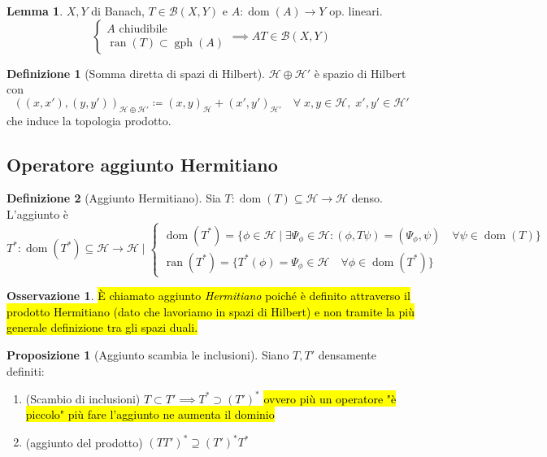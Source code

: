 \documentclass[a4paper,10pt]{article}
\theoremstyle{definition}
\DeclareMathOperator*{\ran}{ran}
\DeclareMathOperator*{\dom}{dom} %
\DeclareMathOperator*{\gr}{gph} %
\newcommand{\hil}{\mathcal{H}} %
\theoremstyle{indentdefinition}
\newtheorem{defn}{Definizione}[section]
\theoremstyle{indenttheorem}
\newtheorem{prop}{Proposizione}
\newtheorem{lem*}{Lemma}
\theoremstyle{myremark}
\newtheorem*{rem*}{Osservazione}
\theoremstyle{indentgeneral}
\begin{document}
\begin{lem*}
    $X,Y$ di Banach, $T\in\mathcal{B}(X,Y)$ e $A:\dom(A)\to Y$ op. lineari. $$\begin{cases}
        A \text{ chiudibile}\\
        \ran(T)\subset\gr(A)
    \end{cases}\implies AT \in \mathcal{B}(X,Y)$$
\end{lem*}

\begin{defn}[Somma diretta di spazi di Hilbert] $\hil\oplus\hil'$ è spazio di Hilbert con $$((x,x'),(y,y'))_{\hil\oplus\hil'}\coloneqq(x,y)_{\hil}+(x',y')_{\hil'}\quad \forall \;x,y\in\hil,\;x',y'\in\hil'$$
    che induce la topologia prodotto.
\end{defn}

\subsection{Operatore aggiunto Hermitiano}

\begin{defn}[Aggiunto Hermitiano]
    Sia $T:\dom(T)\subseteq\hil\to \hil$ denso. L'aggiunto è
    $$T^*:\dom(T^*)\subseteq \hil\to\hil \mid\begin{cases}
        \dom(T^*)= \{\phi\in\hil\mid\exists\Psi_\phi\in\hil: (\phi,T\psi)=(\Psi_\phi,\psi)\quad \forall\psi\in\dom(T)\}\\
        \ran(T^*)=\{T^*(\phi)=\Psi_\phi\in\hil\quad\forall\phi\in\dom(T^*)\}
    \end{cases}$$
\end{defn}

\begin{rem*}
    \hl{È chiamato aggiunto \textit{Hermitiano} poiché è definito attraverso il prodotto Hermitiano  (dato che lavoriamo in spazi di Hilbert) e non tramite la più generale definizione tra gli spazi duali.}
    \end{rem*}

\begin{prop}[Aggiunto scambia le inclusioni] Siano $T,T'$ densamente definiti:
\begin{enumerate}
    \item (Scambio di inclusioni) $T\subset T'\implies T^*\supset (T')^*$ \hl{ovvero più un operatore "è piccolo" più fare l'aggiunto ne aumenta il dominio}
    \item (aggiunto del prodotto) $(TT')^*\supseteq (T')^*T^*$
\end{enumerate}
\end{prop}
\end{document}
